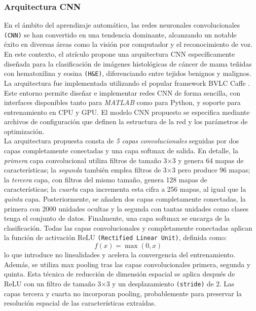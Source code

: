 \documentclass[12pt]{article} %
\begin{document}
\subsubsection{Arquitectura CNN}
En el ámbito del aprendizaje automático, las redes neuronales convolucionales \texttt{(CNN)} se han convertido en una tendencia dominante, alcanzando un notable éxito en diversas áreas como la visión por computador y el reconocimiento de voz. En este contexto, el atrículo \cite{bardou2018classification} propone una arquitectura CNN específicamente diseñada para la clasificación de imágenes histológicas de cáncer de mama teñidas con hematoxilina y eosina \texttt{(H\&E)}, diferenciando entre tejidos benignos y malignos. La arquitectura fue implementada utilizando el popular framework BVLC Caffe \cite{jia2014caffe}. Este entorno permite diseñar e implementar redes CNN de forma sencilla, con interfaces disponibles tanto para \textit{MATLAB} como para Python, y soporte para entrenamiento en CPU y GPU. El modelo CNN propuesto se especifica mediante archivos de configuración que definen la estructura de la red y los parámetros de optimización.\\

La arquitectura propuesta consta de \textit{5 capas convolucionales} seguidas por dos capas completamente conectadas y una capa softmax de salida. En detalle, la \textit{primera} capa convolucional utiliza filtros de tamaño 3×3 y genera 64 mapas de características; la \textit{segunda} también emplea filtros de 3×3 pero produce 96 mapas; la \textit{tercera} capa, con filtros del mismo tamaño, genera 128 mapas de características; la \textit{cuarta} capa incrementa esta cifra a 256 mapas, al igual que la \textit{quinta} capa. Posteriormente, se añaden dos capas completamente conectadas, la primera con 2000 unidades ocultas y la segunda con tantas unidades como clases tenga el conjunto de datos. Finalmente, una capa softmax se encarga de la clasificación. Todas las capas convolucionales y completamente conectadas aplican la función de activación ReLU \texttt{(Rectified Linear Unit)}, definida como: \begin{equation} f(x) = \max(0, x) \end{equation}lo que introduce no linealidades y acelera la convergencia del entrenamiento.\\

Además, se utiliza max pooling tras las capas convolucionales primera, segunda y quinta. Esta técnica de reducción de dimensión espacial se aplica después de ReLU con un filtro de tamaño 3×3 y un desplazamiento \texttt{(stride)} de 2. Las capas tercera y cuarta no incorporan pooling, probablemente para preservar la resolución espacial de las características extraídas. \\
\end{document}
